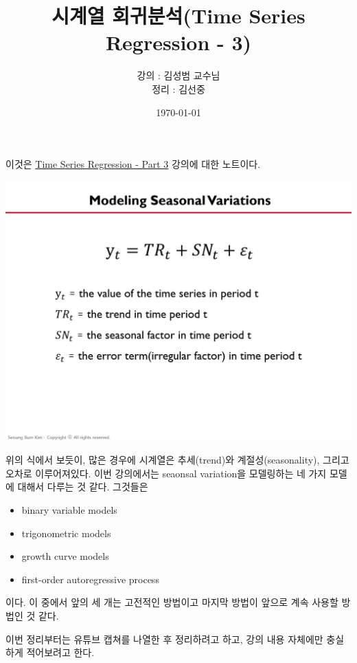 \documentclass{article}
\begin{document}
\title{시계열 회귀분석(Time Series Regression - 3)}
\author{강의 : 김성범 교수님\\ 정리 :  김선중}
\date{\today}
\maketitle

이것은 \href{https://youtu.be/5QnR4L3KGz4}{Time Series Regression - Part 3} 강의에 대한 노트이다.
\tableofcontents

\newpage
\begin{center}
\includegraphics[width=.5\textwidth]{model_0}
\end{center}
위의 식에서 보듯이, 많은 경우에 시계열은 추세(trend)와 계절성(seasonality), 그리고 오차로 이루어져있다.
이번 강의에서는 seaonsal variation을 모델링하는 네 가지 모델에 대해서 다루는 것 같다.
그것들은
\begin{itemize}[itemsep=0pt,parsep=0pt]
\item
binary variable models
\item
trigonometric models
\item
growth curve models
\item
first-order autoregressive process
\end{itemize}
이다.
이 중에서 앞의 세 개는 고전적인 방법이고 마지막 방법이 앞으로 계속 사용할 방법인 것 같다.

이번 정리부터는 유튜브 캡쳐를 나열한 후 정리하려고 하고, 강의 내용 자체에만 충실하게 적어보려고 한다.

\end{document}
